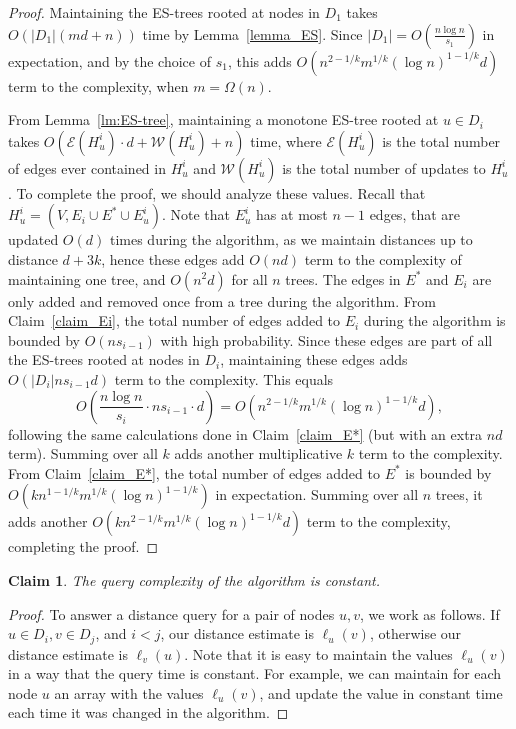 \documentclass[11pt]{article}
\newtheorem{claim}[theorem]{Claim}
\theoremstyle{definition}
\theoremstyle{remark}
\begin{document}
\begin{proof}
Maintaining the ES-trees rooted at nodes in $D_1$ takes $O(|D_1|(md+n))$ time by Lemma~\ref{lemma_ES}. 
Since $|D_1| = O(\frac{n\log{n}}{s_1})$ in expectation, and by the choice of $s_1$, this adds $O(n^{2-1/k}m^{1/k}(\log{n})^{1-1/k} d)$ term to the complexity, when $m=\Omega(n)$. 

From Lemma~\ref{lm:ES-tree}, maintaining a monotone ES-tree rooted at $u \in D_i$ takes $O(\mathcal E(H_u^i)\cdot d+\mathcal W(H_u^i)+n)$ time, where $\mathcal E(H_u^i)$ is the total number of edges ever contained in $H_u^i$ and $\mathcal W(H_u^i)$ is the total number of updates to $H_u^i$. To complete the proof, we should analyze these values. Recall that $H_u^i=(V, E_i \cup E^* \cup E_u^i)$. Note that $E_u^i$ has at most $n-1$ edges, that are updated $O(d)$ times during the algorithm, as we maintain distances up to distance $d+3k$, hence these edges add $O(nd)$ term to the complexity of maintaining one tree, and $O(n^2 d)$ for all $n$ trees. The edges in $E^*$ and $E_i$ are only added and removed once from a tree during the algorithm. From Claim~\ref{claim_Ei}, the total number of edges added to $E_i$ during the algorithm is bounded by $O(ns_{i-1})$ with high probability. Since these edges are part of all the ES-trees rooted at nodes in $D_i$, maintaining these edges adds $O(|D_i| n s_{i-1} d)$ term to the complexity.
This equals $$O \left( \frac{n \log{n}}{s_i} \cdot n s_{i-1} \cdot d \right) = O( n^{2-1/k}m^{1/k}(\log{n})^{1-1/k} d),$$ following the same calculations done in Claim~\ref{claim_E*} (but with an extra $nd$ term). Summing over all $k$ adds another multiplicative $k$ term to the complexity.
From Claim~\ref{claim_E*}, the total number of edges added to $E^*$ is bounded by $O(kn^{1-1/k}m^{1/k}(\log{n})^{1-1/k})$ in expectation. Summing over all $n$ trees, it adds another $O( kn^{2-1/k}m^{1/k}(\log{n})^{1-1/k} d)$ term to the complexity, completing the proof.
\end{proof}

\begin{claim}
The query complexity of the algorithm is constant.
\end{claim}

\begin{proof}
To answer a distance query for a pair of nodes $u,v$, we work as follows. If $u \in D_i, v \in D_j$, and $i<j$, our distance estimate is $\ell_u(v)$, otherwise our distance estimate is $\ell_v(u)$. Note that it is easy to maintain the values $\ell_u(v)$ in a way that the query time is constant. For example, we can maintain for each node $u$ an array with the values $\ell_u(v)$, and update the value in constant time each time it was changed in the algorithm.
\end{proof}
\end{document}
